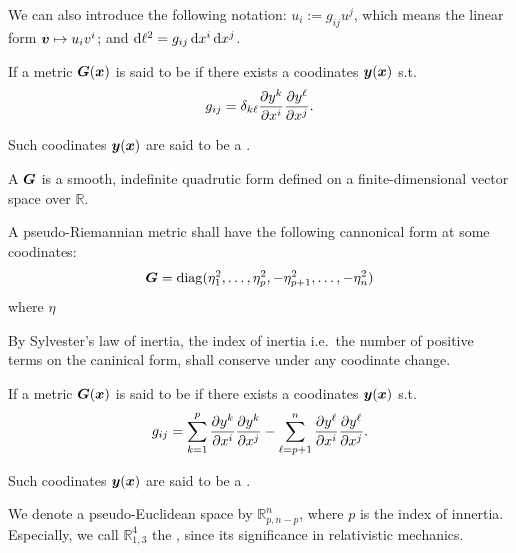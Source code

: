 \documentclass[openany]{book}
\begin{document}
We can also introduce the following notation: $u_i := g_{ij}u^j$, which means the linear form $\boldsymbol{v} \mapsto u_i v^i$; 
and $\mathop{}\!\mathrm{d} \ell^2 = g_{ij} \mathop{}\!\mathrm{d} x^i \mathop{}\!\mathrm{d} x^j$. 

\begin{definition}
	If a metric $\boldsymbol{G}(\boldsymbol{x})$ is said to be  if there exists a coodinates $\boldsymbol{y}(\boldsymbol{x})$ s.t.\ 
	\begin{equation*}
		g_{ij} = \delta_{k\ell} \pdiff{y^k}{x^i} \pdiff{y^\ell}{x^j}.
	\end{equation*}  

	Such coodinates $\boldsymbol{y}(\boldsymbol{x})$ are said to be a .
\end{definition}

\begin{definition}
	A  $\boldsymbol{G}$ is a smooth, indefinite quadrutic form defined on a finite-dimensional vector space over $\mathbb R$.
\end{definition}

A pseudo-Riemannian metric shall have the following cannonical form at some coodinates:
\begin{equation*}
	\boldsymbol{G} = \operatorname{diag} (\eta^2_1, \ldots, \eta^2_p, - \eta^2_{p+1}, \ldots, -\eta^2_n)
\end{equation*}
where $\eta$

By Sylvester's law of inertia, the index of inertia i.e.\ the number of positive terms on the caninical form, shall conserve under any coodinate change.

\begin{definition}
	If a metric $\boldsymbol{G}(\boldsymbol{x})$ is said to be  if there exists a coodinates $\boldsymbol{y}(\boldsymbol{x})$ s.t.\ 
	\begin{equation*}
		g_{ij} = \sum_{k = 1}^p \pdiff{y^k}{x^i} \pdiff{y^k}{x^j} - \sum_{\ell = p + 1}^n \pdiff{y^\ell}{x^i} \pdiff{y^\ell}{x^j}.
	\end{equation*}  

	Such coodinates $\boldsymbol{y}(\boldsymbol{x})$ are said to be a .
\end{definition}

We denote a pseudo-Euclidean space by $\mathbb R^n_{p, n-p}$, where $p$ is the index of innertia.
Especially, we call $\mathbb R^4_{1, 3}$ the , since its significance in relativistic mechanics.
\end{document}
